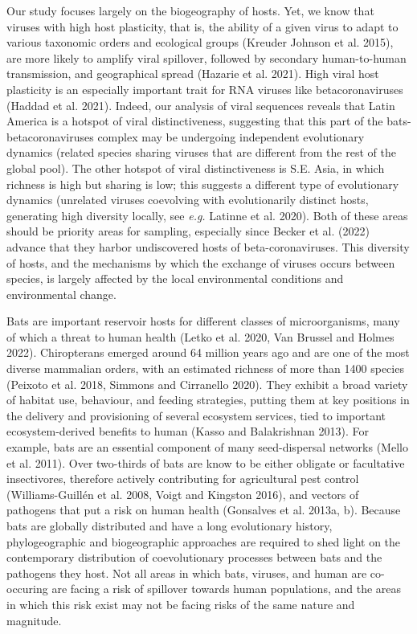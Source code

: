 \documentclass[11pt]{article}
\begin{document}
Our study focuses largely on the biogeography of hosts. Yet, we know
that viruses with high host plasticity, that is, the ability of a given
virus to adapt to various taxonomic orders and ecological groups
(Kreuder Johnson et al. 2015), are more likely to amplify viral
spillover, followed by secondary human-to-human transmission, and
geographical spread (Hazarie et al. 2021). High viral host plasticity is
an especially important trait for RNA viruses like betacoronaviruses
(Haddad et al. 2021). Indeed, our analysis of viral sequences reveals
that Latin America is a hotspot of viral distinctiveness, suggesting
that this part of the bats-betacoronaviruses complex may be undergoing
independent evolutionary dynamics (related species sharing viruses that
are different from the rest of the global pool). The other hotspot of
viral distinctiveness is S.E. Asia, in which richness is high but
sharing is low; this suggests a different type of evolutionary dynamics
(unrelated viruses coevolving with evolutionarily distinct hosts,
generating high diversity locally, see \emph{e.g.} Latinne et al. 2020).
Both of these areas should be priority areas for sampling, especially
since Becker et al. (2022) advance that they harbor undiscovered hosts
of beta-coronaviruses. This diversity of hosts, and the mechanisms by
which the exchange of viruses occurs between species, is largely
affected by the local environmental conditions and environmental change.

Bats are important reservoir hosts for different classes of
microorganisms, many of which a threat to human health (Letko et al.
2020, Van Brussel and Holmes 2022). Chiropterans emerged around 64
million years ago and are one of the most diverse mammalian orders, with
an estimated richness of more than 1400 species (Peixoto et al. 2018,
Simmons and Cirranello 2020). They exhibit a broad variety of habitat
use, behaviour, and feeding strategies, putting them at key positions in
the delivery and provisioning of several ecosystem services, tied to
important ecosystem-derived benefits to human (Kasso and Balakrishnan
2013). For example, bats are an essential component of many
seed-dispersal networks (Mello et al. 2011). Over two-thirds of bats are
know to be either obligate or facultative insectivores, therefore
actively contributing for agricultural pest control (Williams-Guillén et
al. 2008, Voigt and Kingston 2016), and vectors of pathogens that put a
risk on human health (Gonsalves et al. 2013a, b). Because bats are
globally distributed and have a long evolutionary history,
phylogeographic and biogeographic approaches are required to shed light
on the contemporary distribution of coevolutionary processes between
bats and the pathogens they host. Not all areas in which bats, viruses,
and human are co-occuring are facing a risk of spillover towards human
populations, and the areas in which this risk exist may not be facing
risks of the same nature and magnitude.
\end{document}
